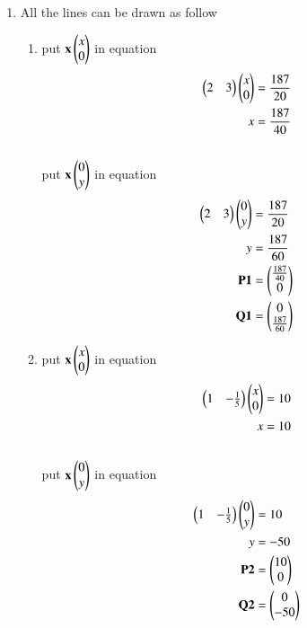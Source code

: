 \renewcommand{\theequation}{\theenumi}
\begin{enumerate}[label=\arabic*.,ref=\thesubsection.\theenumi]
\item All the lines can be drawn as follow
\begin{enumerate}
\item put $\mathbf {x} \begin{pmatrix}x\\0\end{pmatrix}$ in equation
\\ 
\begin{align}
\begin{pmatrix}2 & 3\end{pmatrix}\begin{pmatrix}x\\0\end{pmatrix} &= \frac{187}{20}
\\
x&= \frac{187}{40}
\end{align}
\\
put $\mathbf {x} \begin{pmatrix}0\\y\end{pmatrix}$ in equation
\\
\begin{align}
\begin{pmatrix}2 & 3\end{pmatrix}\begin{pmatrix}0\\y\end{pmatrix} &= \frac{187}{20}
\\
y&= \frac{187}{60}
\\
\mathbf{P1} &= \begin{pmatrix}\frac{187}{40}\\0\end{pmatrix}
\\\mathbf{Q1} &= \begin{pmatrix}0\\\frac{187}{60}\end{pmatrix}
\end{align}



\item put $\mathbf{ x} \begin{pmatrix}x\\0\end{pmatrix}$ in equation 
\begin{align}
\begin{pmatrix}1 & -\frac{1}{5}\end{pmatrix}\begin{pmatrix}x\\0\end{pmatrix} &= 10
\\
x&= 10
\end{align}
\\
put $\mathbf {x} \begin{pmatrix}0\\y\end{pmatrix}$ in equation
\\
\begin{align}
\begin{pmatrix}1 & -\frac{1}{5}\end{pmatrix}\begin{pmatrix}0\\y\end{pmatrix} &= 10
\\
y&= -50
\\
\mathbf{P2} &= \begin{pmatrix}10\\0\end{pmatrix}
\\ \mathbf{Q2} &= \begin{pmatrix}0\\-50\end{pmatrix}
\end{align}



\end{enumerate}
\end{enumerate}
